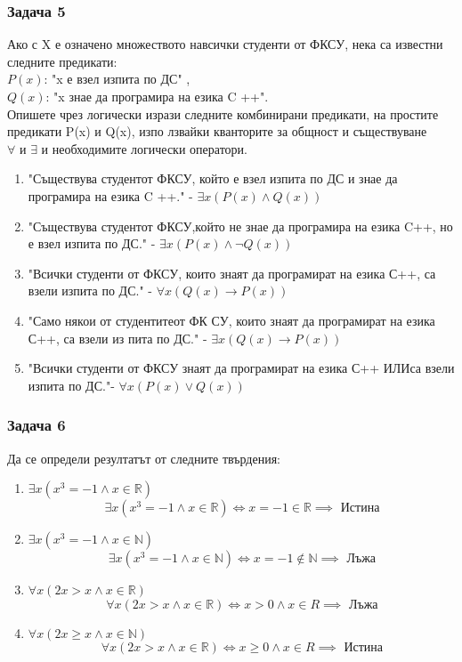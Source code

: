 \documentclass[fleqn, 12pt]{article}
\theoremstyle{definition}
\begin{document}
\subsubsection*{Задача 5}
Ако с X е означено множеството навсички студенти от ФКСУ, нека са известни следните предикати:\\
$P(x)$: "x е взел изпита по ДС" , \\
$Q(x)$: "x знае да програмира на езика C ++".   \\
Опишете  чрез  логически  изрази  следните  комбинирани  предикати,  на  простите предикати  P(x) и   Q(x), изпо лзвайки кванторите за общност и съществуване  $\forall \text{ и } \exists$ и необходимите логически оператори. 
\begin{enumerate}
\item "Съществува студентот ФКСУ, който е взел изпита по ДС и знае  да програмира на езика C ++." - 
$\exists x(P(x) \land Q(x))$
\item "Съществува студентот ФКСУ,който не знае да програмира на езика C++, но е взел изпита по ДС." - 
$\exists x(P(x) \land \neg Q(x))$
\item "Всички студенти от ФКСУ, които знаят да програмират на езика С++, са взели изпита по ДС."  - 
$\forall x(Q(x) \to P(x))$
\item "Само някои от студентитеот ФК СУ, които знаят да програмират на езика С++, са взели из   пита по ДС." - 
$\exists x(Q(x) \to P(x))$
\item "Всички студенти от ФКСУ знаят да програмират на езика С++ ИЛИса взели изпита по ДС."-
$\forall x(P(x) \lor Q(x))$
\end{enumerate}

\subsubsection*{Задача 6}
Да се определи резултатът от следните твърдения: 
\begin{enumerate}
\item $\exists x(x^3 = -1 \land x \in \mathbb{R})$
$$\exists x(x^3 = -1 \land x \in \mathbb{R}) \Leftrightarrow x = -1 \in \mathbb{R} \implies \text{ Истина}$$  
\item $\exists x(x^3 = -1 \land x \in \mathbb{N})$
$$\exists x(x^3 = -1 \land x \in \mathbb{N}) \Leftrightarrow x = -1 \notin \mathbb{N} \implies \text{ Лъжа}$$  
\item $\forall x(2x > x \land x \in \mathbb{R})$
$$\forall x(2x > x \land x \in \mathbb{R}) \Leftrightarrow x>0 \land x \in R \implies \text{ Лъжа} $$  
\item $\forall x(2x \geq x \land x \in \mathbb{N})$
$$\forall x(2x > x \land x \in \mathbb{R}) \Leftrightarrow x \geq 0 \land x \in R \implies \text{ Истина} $$  
\end{enumerate}
\newpage
\end{document}
